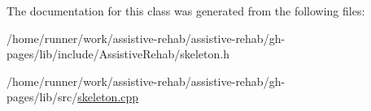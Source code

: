 The documentation for this class was generated from the following files\+:\begin{DoxyCompactItemize}
\item 
/home/runner/work/assistive-\/rehab/assistive-\/rehab/gh-\/pages/lib/include/\+Assistive\+Rehab/skeleton.\+h\item 
/home/runner/work/assistive-\/rehab/assistive-\/rehab/gh-\/pages/lib/src/\hyperlink{skeleton_8cpp}{skeleton.\+cpp}\end{DoxyCompactItemize}
